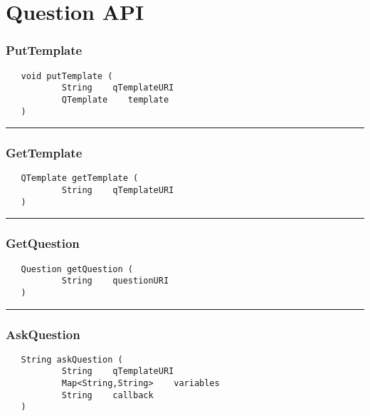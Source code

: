 \chapter{Question API}

\subsection{PutTemplate}
\label{Api:PutTemplate}
\begin{verbatim}
   void putTemplate (
           String    qTemplateURI
           QTemplate    template
   )
\end{verbatim}



\rule{15cm}{2pt}
\subsection{GetTemplate}
\label{Api:GetTemplate}
\begin{verbatim}
   QTemplate getTemplate (
           String    qTemplateURI
   )
\end{verbatim}



\rule{15cm}{2pt}
\subsection{GetQuestion}
\label{Api:GetQuestion}
\begin{verbatim}
   Question getQuestion (
           String    questionURI
   )
\end{verbatim}



\rule{15cm}{2pt}
\subsection{AskQuestion}
\label{Api:AskQuestion}
\begin{verbatim}
   String askQuestion (
           String    qTemplateURI
           Map<String,String>    variables
           String    callback
   )
\end{verbatim}



